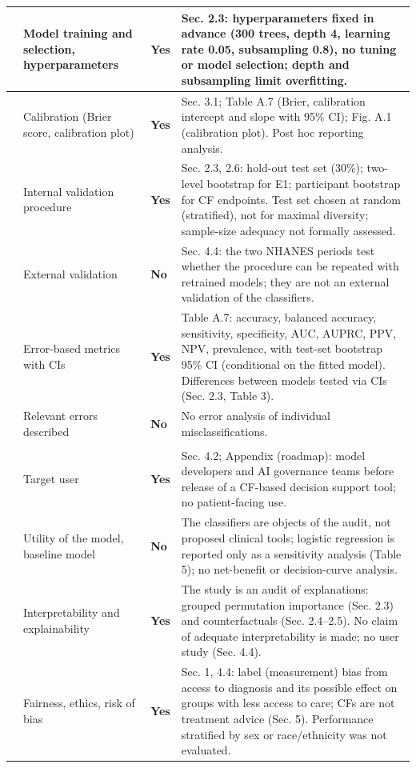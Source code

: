 \documentclass[9pt]{extarticle}
\begin{document}
\begin{longtable}{>{\raggedright\arraybackslash}p{1.0cm}>{\raggedright\arraybackslash}p{7.2cm}>{\centering\arraybackslash}p{1.4cm}>{\raggedright\arraybackslash}p{14.6cm}}
18 & Model training and selection, hyperparameters & \textbf{Yes} & Sec. 2.3: hyperparameters fixed in advance (300 trees, depth 4, learning rate 0.05, subsampling 0.8), no tuning or model selection; depth and subsampling limit overfitting.\\ \midrule
19 & Calibration (Brier score, calibration plot) & \textbf{Yes} & Sec. 3.1; Table A.7 (Brier, calibration intercept and slope with 95\% CI); Fig. A.1 (calibration plot). Post hoc reporting analysis.\\ \midrule
20 & Internal validation procedure & \textbf{Yes} & Sec. 2.3, 2.6: hold-out test set (30\%); two-level bootstrap for E1; participant bootstrap for CF endpoints. Test set chosen at random (stratified), not for maximal diversity; sample-size adequacy not formally assessed.\\ \midrule
21 & External validation & \textbf{No} & Sec. 4.4: the two NHANES periods test whether the procedure can be repeated with retrained models; they are not an external validation of the classifiers.\\ \midrule
22 & Error-based metrics with CIs & \textbf{Yes} & Table A.7: accuracy, balanced accuracy, sensitivity, specificity, AUC, AUPRC, PPV, NPV, prevalence, with test-set bootstrap 95\% CI (conditional on the fitted model). Differences between models tested via CIs (Sec. 2.3, Table 3).\\ \midrule
23 & Relevant errors described & \textbf{No} & No error analysis of individual misclassifications.\\ \midrule
\multicolumn{4}{l}{\textbf{Deployment}}\\ \midrule
24 & Target user & \textbf{Yes} & Sec. 4.2; Appendix (roadmap): model developers and AI governance teams before release of a CF-based decision support tool; no patient-facing use.\\ \midrule
25 & Utility of the model, baseline model & \textbf{No} & The classifiers are objects of the audit, not proposed clinical tools; logistic regression is reported only as a sensitivity analysis (Table 5); no net-benefit or decision-curve analysis.\\ \midrule
26 & Interpretability and explainability & \textbf{Yes} & The study is an audit of explanations: grouped permutation importance (Sec. 2.3) and counterfactuals (Sec. 2.4--2.5). No claim of adequate interpretability is made; no user study (Sec. 4.4).\\ \midrule
27 & Fairness, ethics, risk of bias & \textbf{Yes} & Sec. 1, 4.4: label (measurement) bias from access to diagnosis and its possible effect on groups with less access to care; CFs are not treatment advice (Sec. 5). Performance stratified by sex or race/ethnicity was not evaluated.\\ \midrule

\end{longtable}
\end{document}
